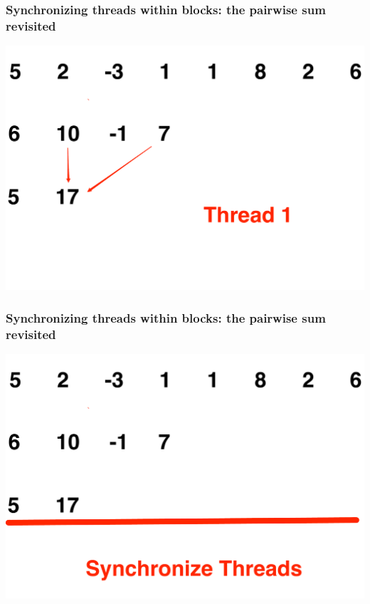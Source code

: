 \documentclass[handout]{beamer}
\numberwithin{equation}{section}
\begin{document}
\begin{frame}
\frametitle{Synchronizing threads within blocks: the pairwise sum revisited}
 \begin{center}
\includegraphics[scale = .25]{../../fig/psum7}
\end{center}
\end{frame}

\begin{frame}
\frametitle{Synchronizing threads within blocks: the pairwise sum revisited}
 \begin{center}
\includegraphics[scale = .25]{../../fig/psum8}
\end{center}
\end{frame}
\end{document}
